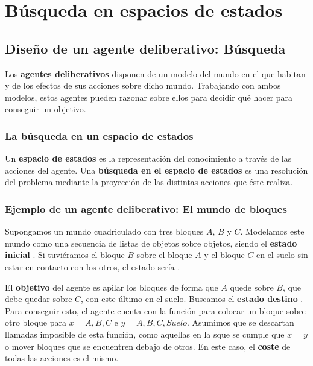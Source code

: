 \chapter{Búsqueda en espacios de estados}

\section{Diseño de un agente deliberativo: Búsqueda}

Los \textbf{agentes deliberativos} disponen de un modelo del mundo en el que habitan y de los efectos de sus acciones sobre dicho mundo.
Trabajando con ambos modelos, estos agentes pueden razonar sobre ellos para decidir qué hacer para conseguir un objetivo.

\subsection{La búsqueda en un espacio de estados}

Un \textbf{espacio de estados} es la representación del conocimiento a través de las acciones del agente.
Una \textbf{búsqueda en el espacio de estados} es una resolución del problema mediante la proyección de las distintas acciones que éste realiza.

\subsection{Ejemplo de un agente deliberativo: El mundo de bloques}

Supongamos un mundo cuadriculado con tres bloques $A$, $B$ y $C$.
Modelamos este mundo como una secuencia de listas de objetos sobre objetos, siendo el \textbf{estado inicial} \code{[[A],[B],[C]]}.
Si tuviéramos el bloque $B$ sobre el bloque $A$ y el bloque $C$ en el suelo sin estar en contacto con los otros, el estado sería \code{[[B,A],[C]]}.

El \textbf{objetivo} del agente es apilar los bloques de forma que $A$ quede sobre $B$, que debe quedar sobre $C$, con este último en el suelo.
Buscamos el \textbf{estado destino} \code{[[A,B,C]]}.
Para conseguir esto, el agente cuenta con la función  para colocar un bloque  sobre otro bloque  para $x={A,B,C}$ e $y={A,B,C,Suelo}$.
Asumimos que se descartan llamadas imposible de esta función, como aquellas en la sque se cumple que $x=y$ o mover bloques que se encuentren debajo de otros.
En este caso, el \textbf{coste} de todas las acciones es el mismo.

